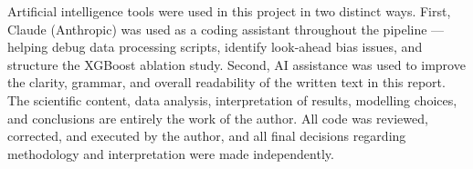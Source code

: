 Artificial intelligence tools were used in this project in two distinct ways. First, Claude (Anthropic) was used as a coding assistant throughout the pipeline --- helping debug data processing scripts, identify look-ahead bias issues, and structure the XGBoost ablation study. Second, AI assistance was used to improve the clarity, grammar, and overall readability of the written text in this report. The scientific content, data analysis, interpretation of results, modelling choices, and conclusions are entirely the work of the author. All code was reviewed, corrected, and executed by the author, and all final decisions regarding methodology and interpretation were made independently.
